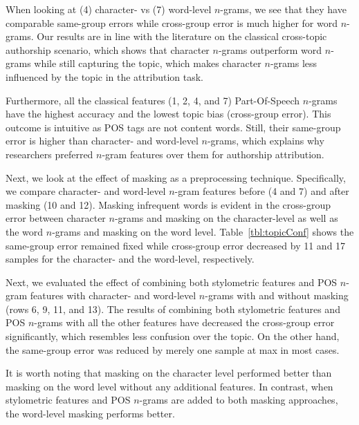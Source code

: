 \documentclass[11pt]{article}
\begin{document}
When looking at (4) character- vs (7) word-level $n$-grams, we see that they have comparable same-group errors while cross-group error is much higher for word $n$-grams. Our results are in line with the literature on the classical cross-topic authorship scenario, which shows that character $n$-grams outperform word $n$-grams while still capturing the topic, which makes character $n$-grams less influenced by the topic in the attribution task.

Furthermore, all the classical features (1, 2, 4, and 7) Part-Of-Speech $n$-grams have the highest accuracy and the lowest topic bias (cross-group error). This outcome is intuitive as POS tags are not content words. Still, their same-group error is higher than character- and word-level $n$-grams, which explains why researchers preferred $n$-gram features over them for authorship attribution.  

Next, we look at the effect of masking as a preprocessing technique. Specifically, we compare character- and word-level $n$-gram features before (4 and 7) and after masking (10 and 12). Masking infrequent words is evident in the cross-group error between character $n$-grams and masking on the character-level as well as the word $n$-grams and masking on the word level. Table~\ref{tbl:topicConf} shows the same-group error remained fixed while cross-group error decreased by 11 and 17 samples for the character- and the word-level, respectively. 


Next, we evaluated the effect of combining both stylometric features and POS $n$-gram features with character- and word-level $n$-grams with and without masking (rows 6, 9, 11, and 13). The results of combining both stylometric features and POS $n$-grams with all the other features have decreased the cross-group error significantly, which resembles less confusion over the topic. On the other hand, the same-group error was reduced by merely one sample at max in most cases. 

It is worth noting that masking on the character level performed better than masking on the word level without any additional features. In contrast, when stylometric features and POS $n$-grams are added to both masking approaches, the word-level masking performs better.
\end{document}
